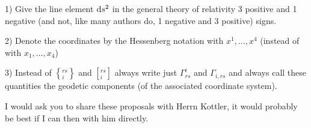 \begin{letter}{5}
1) Give the line element $\mathrm{d}{s}^2$ in the general theory of relativity 3 positive and 1 negative (and not, like many authors do, 1 negative and 3 positive) signs.

2) Denote the coordinates by the Hessenberg notation with $x^1,\dots,x^4$ (instead of with $x_1,\dots,x_4$)

3) Instead of $\left\{{}^{rs}_{i}\right\}$ and $\left[{}^{rs}_{i}\right]$ always write just $\Gamma^i_{rs}$ and $\Gamma_{i,rs}$ and always call these quantities the geodetic components (of the associated coordinate system). 

I would ask you to share these proposals with Herrn Kottler, it would probably be best if I can then  with him directly.


\end{letter}